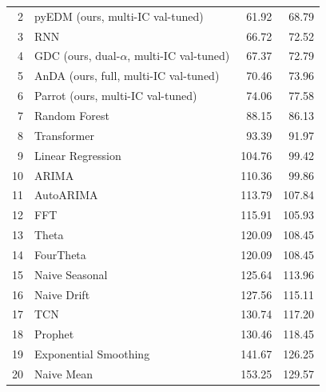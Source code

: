 \begin{table}[t]
\begin{tabular}{r l r r}
 2 & pyEDM (ours, multi-IC val-tuned)        & 61.92 & 68.79 \\
 3 & RNN                                     & 66.72 & 72.52 \\
 4 & GDC (ours, dual-$\alpha$, multi-IC val-tuned) & 67.37 & 72.79 \\
 5 & AnDA (ours, full, multi-IC val-tuned)   & 70.46 & 73.96 \\
 6 & Parrot (ours, multi-IC val-tuned)       & 74.06 & 77.58 \\
 7 & Random Forest                           & 88.15 & 86.13 \\
 8 & Transformer                             & 93.39 & 91.97 \\
 9 & Linear Regression                       & 104.76 & 99.42 \\
10 & ARIMA                                   & 110.36 & 99.86 \\
11 & AutoARIMA                               & 113.79 & 107.84 \\
12 & FFT                                     & 115.91 & 105.93 \\
13 & Theta                                   & 120.09 & 108.45 \\
14 & FourTheta                               & 120.09 & 108.45 \\
15 & Naive Seasonal                          & 125.64 & 113.96 \\
16 & Naive Drift                             & 127.56 & 115.11 \\
17 & TCN                                     & 130.74 & 117.20 \\
18 & Prophet                                 & 130.46 & 118.45 \\
19 & Exponential Smoothing                   & 141.67 & 126.25 \\
20 & Naive Mean                              & 153.25 & 129.57 \\
\bottomrule
\end{tabular}
\end{table}


